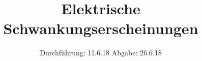 

\subject{V 57}
\title{Elektrische Schwankungserscheinungen}
\date{
  Durchführung: 11.6.18
  \hspace{3em}
  Abgabe: 26.6.18
}



\maketitle
\thispagestyle{empty}
\tableofcontents
\newpage






\printbibliography




